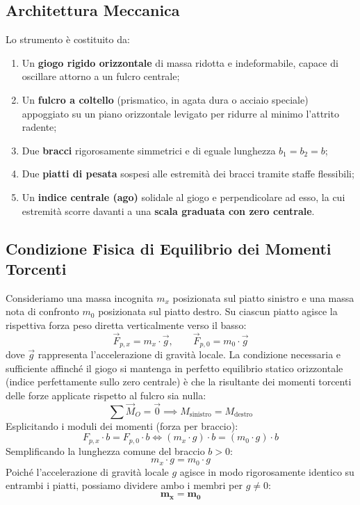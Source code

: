 \documentclass[11pt,a4paper,oneside]{report}
\begin{document}
\subsection{Architettura Meccanica}
Lo strumento è costituito da:
\begin{enumerate}
  \item Un \textbf{giogo rigido orizzontale} di massa ridotta e indeformabile, capace di oscillare attorno a un fulcro centrale;
  \item Un \textbf{fulcro a coltello} (prismatico, in agata dura o acciaio speciale) appoggiato su un piano orizzontale levigato per ridurre al minimo l'attrito radente;
  \item Due \textbf{bracci} rigorosamente simmetrici e di eguale lunghezza $b_1 = b_2 = b$;
  \item Due \textbf{piatti di pesata} sospesi alle estremità dei bracci tramite staffe flessibili;
  \item Un \textbf{indice centrale (ago)} solidale al giogo e perpendicolare ad esso, la cui estremità scorre davanti a una \textbf{scala graduata con zero centrale}.
\end{enumerate}

\subsection{Condizione Fisica di Equilibrio dei Momenti Torcenti}
Consideriamo una massa incognita $m_x$ posizionata sul piatto sinistro e una massa nota di confronto $m_0$ posizionata sul piatto destro. 
Su ciascun piatto agisce la rispettiva forza peso diretta verticalmente verso il basso:
\[
\vec{F}_{p,x} = m_x \cdot \vec{g}, \qquad \vec{F}_{p,0} = m_0 \cdot \vec{g}
\]
dove $\vec{g}$ rappresenta l'accelerazione di gravità locale.
La condizione necessaria e sufficiente affinché il giogo si mantenga in perfetto equilibrio statico orizzontale (indice perfettamente sullo zero centrale) è che la risultante dei momenti torcenti delle forze applicate rispetto al fulcro sia nulla:
\[
\sum \vec{M}_O = \vec{0} \implies M_{\text{sinistro}} = M_{\text{destro}}
\]
Esplicitando i moduli dei momenti (forza per braccio):
\[
F_{p,x} \cdot b = F_{p,0} \cdot b \iff (m_x \cdot g) \cdot b = (m_0 \cdot g) \cdot b
\]
Semplificando la lunghezza comune del braccio $b > 0$:
\[
m_x \cdot g = m_0 \cdot g
\]
Poiché l'accelerazione di gravità locale $g$ agisce in modo rigorosamente identico su entrambi i piatti, possiamo dividere ambo i membri per $g \neq 0$:
\[
\mathbf{m_x = m_0}
\]
\end{document}
